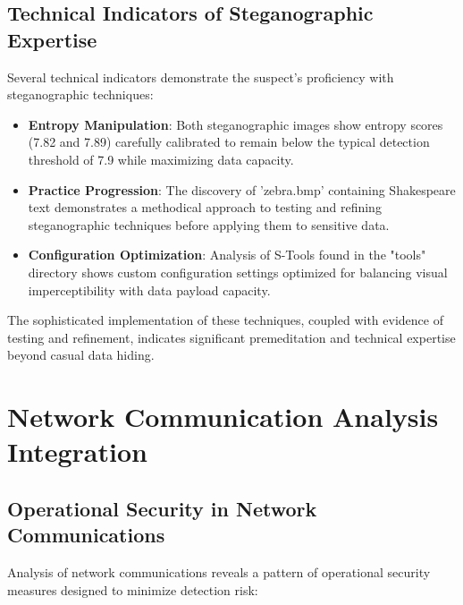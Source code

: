 \subsection{Technical Indicators of Steganographic Expertise}
Several technical indicators demonstrate the suspect's proficiency with steganographic techniques:

\begin{itemize}
    \item \textbf{Entropy Manipulation}: Both steganographic images show entropy scores (7.82 and 7.89) carefully calibrated to remain below the typical detection threshold of 7.9 while maximizing data capacity.
    
    \item \textbf{Practice Progression}: The discovery of 'zebra.bmp' containing Shakespeare text demonstrates a methodical approach to testing and refining steganographic techniques before applying them to sensitive data.
    
    \item \textbf{Configuration Optimization}: Analysis of S-Tools found in the "tools" directory shows custom configuration settings optimized for balancing visual imperceptibility with data payload capacity.
\end{itemize}

The sophisticated implementation of these techniques, coupled with evidence of testing and refinement, indicates significant premeditation and technical expertise beyond casual data hiding.

\section{Network Communication Analysis Integration}
\subsection{Operational Security in Network Communications}
Analysis of network communications reveals a pattern of operational security measures designed to minimize detection risk:

